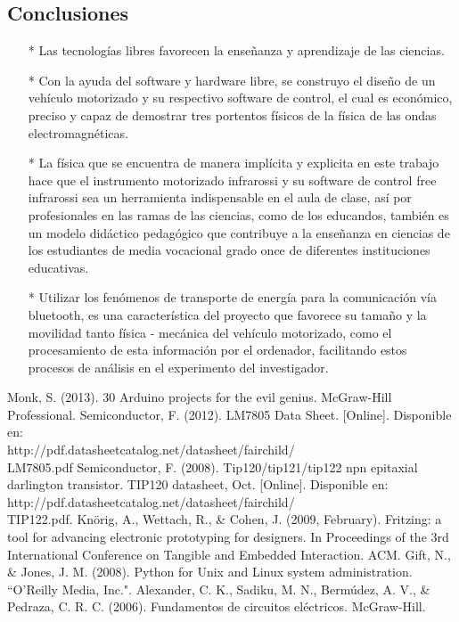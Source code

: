 \documentclass[12]{article}
\begin{document}
\begin{multicols}{2}
\section{Conclusiones}
\begin{enumerate}
\item[*] Las tecnologías libres favorecen la enseñanza y aprendizaje de las ciencias.
\item[*] Con la ayuda del software y hardware libre, se construyo el diseño de un vehículo motorizado  y su respectivo software de control, el cual es económico, preciso y capaz de demostrar tres portentos físicos de la física de las ondas electromagnéticas.
\item[*] La física que se encuentra de manera implícita y explicita en este trabajo hace que el instrumento motorizado infrarossi y su software de control free infrarossi sea un herramienta indispensable  en el aula de clase, así por profesionales en las ramas de las ciencias, como de los educandos, también es un modelo didáctico pedagógico que contribuye a la enseñanza en ciencias de los estudiantes de media vocacional grado once de diferentes instituciones educativas. 
\item[*] Utilizar los fenómenos de transporte de energía para la comunicación vía bluetooth, es una característica del proyecto que favorece su tamaño y la movilidad tanto física - mecánica del vehículo motorizado, como el procesamiento de esta información por el ordenador, facilitando estos procesos de análisis en el experimento del investigador. 
\end{enumerate}
\begin{thebibliography}{99}
 Monk, S. (2013). 30 Arduino projects for the evil genius. McGraw-Hill Professional.
 Semiconductor, F. (2012). LM7805 Data Sheet. [Online]. Disponible en:\\ http://pdf.datasheetcatalog.net/datasheet/fairchild/\\LM7805.pdf
 Semiconductor, F. (2008). Tip120/tip121/tip122 npn epitaxial darlington transistor. TIP120 datasheet, Oct. [Online]. Disponible en:\\ http://pdf.datasheetcatalog.net/datasheet/fairchild/\\TIP122.pdf.
 Knörig, A., Wettach, R., \& Cohen, J. (2009, February). Fritzing: a tool for advancing electronic prototyping for designers. In Proceedings of the 3rd International Conference on Tangible and Embedded Interaction. ACM.
 Gift, N., \& Jones, J. M. (2008). Python for Unix and Linux system administration. ``O'Reilly Media, Inc.".
 Alexander, C. K., Sadiku, M. N., Bermúdez, A. V., \& Pedraza, C. R. C. (2006). Fundamentos de circuitos eléctricos. McGraw-Hill. 
\end{thebibliography}
\end{multicols}
\end{document}
